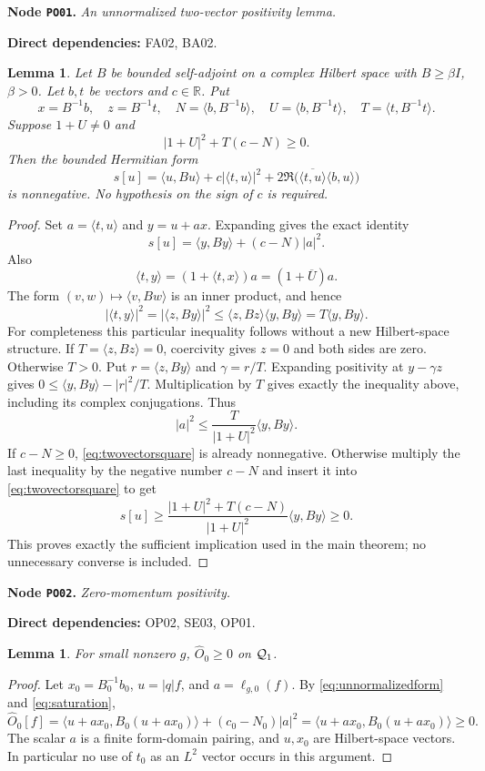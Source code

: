 \documentclass[11pt,a4paper]{article}
\newtheorem{lemma}[theorem]{Lemma}
\theoremstyle{remark}\newtheorem{remark}[theorem]{Remark}
\newcommand{\R}{\mathbb R}\newcommand{\C}{\mathbb C}\newcommand{\N}{\mathbb N}
\newcommand{\ip}[2]{\langle #1,#2\rangle}\newcommand{\norm}[1]{\lVert #1\rVert}
\newcommand{\abs}[1]{\lvert #1\rvert}\newcommand{\rankone}[2]{\lvert #1\rangle\langle #2\rvert}
\newcommand{\node}[3]{\par\Needspace{6\baselineskip}\smallskip\hypertarget{node:#1}{}\label{nodepage:#1}\noindent\textbf{Node \texttt{#1}.} \textit{#2.}\par\noindent\textbf{Direct dependencies:} #3.\par}
\begin{document}
\node{PO01}{An unnormalized two-vector positivity lemma}{FA02, BA02}
\begin{lemma}\label{lem:rankpositivity}
Let $B$ be bounded self-adjoint on a complex Hilbert space with $B\geq\beta I$, $\beta>0$. Let $b,t$ be vectors and $c\in\R$. Put
\[
 x=B^{-1}b,\quad z=B^{-1}t,\quad
 N=\ip b{B^{-1}b},\quad U=\ip b{B^{-1}t},\quad T=\ip t{B^{-1}t}.
\]
Suppose $1+U\ne0$ and
\begin{equation}
 \abs{1+U}^2+T(c-N)\geq0.\label{eq:scalarcriterion}
\end{equation}
Then the bounded Hermitian form
\[
 s[u]=\ip u{Bu}+c\abs{\ip t u}^2
          +2\Re\bigl(\overline{\ip t u}\ip b u\bigr)
\]
is nonnegative. No hypothesis on the sign of $c$ is required.
\end{lemma}
\begin{proof}
Set $a=\ip t u$ and $y=u+ax$. Expanding gives the exact identity
\begin{equation}
 s[u]=\ip y{By}+(c-N)\abs a^2.\label{eq:twovectorsquare}
\end{equation}
Also
\[
 \ip t y=(1+\ip t x)a=(1+\overline U)a.
\]
The form $(v,w)\mapsto\ip v{Bw}$ is an inner product, and hence
\[
 \abs{\ip t y}^2=\abs{\ip z{By}}^2
 \leq\ip z{Bz}\ip y{By}=T\ip y{By}.
\]
For completeness this particular inequality follows without a new Hilbert-space structure. If $T=\langle z,Bz\rangle=0$, coercivity gives $z=0$ and both sides are zero. Otherwise $T>0$. Put $r=\langle z,By\rangle$ and $\gamma=r/T$. Expanding positivity at $y-\gamma z$ gives
$0\leq\langle y,By\rangle-|r|^2/T$.
Multiplication by $T$ gives exactly the inequality above, including its complex conjugations. Thus
\[
 \abs a^2\leq\frac{T}{\abs{1+U}^2}\ip y{By}.
\]
If $c-N\geq0$, \eqref{eq:twovectorsquare} is already nonnegative. Otherwise multiply the last inequality by the negative number $c-N$ and insert it into \eqref{eq:twovectorsquare} to get
\[
 s[u]\geq
 \frac{\abs{1+U}^2+T(c-N)}{\abs{1+U}^2}\ip y{By}\geq0.
\]
This proves exactly the sufficient implication used in the main theorem; no unnecessary converse is included.
\end{proof}

\node{PO02}{Zero-momentum positivity}{OP02, SE03, OP01}
\begin{lemma}\label{lem:zeropositive}
For small nonzero $g$, $\widehat O_0\geq0$ on $\mathcal Q_1$.
\end{lemma}
\begin{proof}
Let $x_0=B_0^{-1}b_0$, $u=\abs q f$, and $a=\ell_{g,0}(f)$. By \eqref{eq:unnormalizedform} and \eqref{eq:saturation},
\[
 \widehat O_0[f]
 =\ip{u+ax_0}{B_0(u+ax_0)}+(c_0-N_0)\abs a^2
 =\ip{u+ax_0}{B_0(u+ax_0)}\geq0.
\]
The scalar $a$ is a finite form-domain pairing, and $u,x_0$ are Hilbert-space vectors. In particular no use of $t_0$ as an $L^2$ vector occurs in this argument.
\end{proof}
\end{document}
